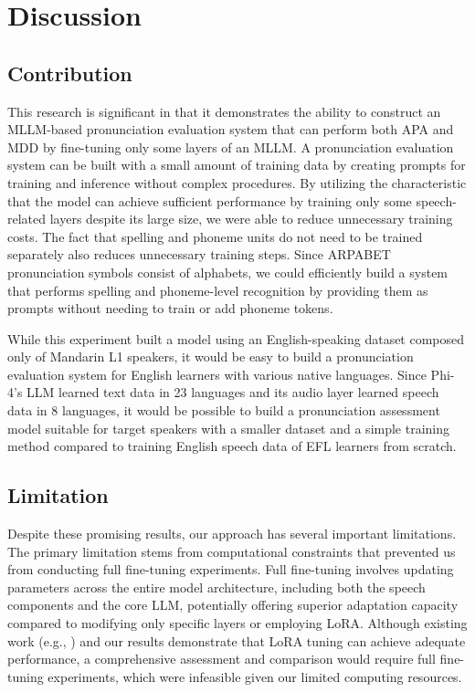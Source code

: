 \documentclass[sigconf,nonacm]{acmart}
\begin{document}
\section{Discussion}
\subsection{Contribution}
This research is significant in that it demonstrates the ability to construct an MLLM-based pronunciation evaluation system that can perform both APA and MDD by fine-tuning only some layers of an MLLM. A pronunciation evaluation system can be built with a small amount of training data by creating prompts for training and inference without complex procedures. By utilizing the characteristic that the model can achieve sufficient performance by training only some speech-related layers despite its large size, we were able to reduce unnecessary training costs. The fact that spelling and phoneme units do not need to be trained separately also reduces unnecessary training steps. Since ARPABET pronunciation symbols consist of alphabets, we could efficiently build a system that performs spelling and phoneme-level recognition by providing them as prompts without needing to train or add phoneme tokens.

While this experiment built a model using an English-speaking dataset composed only of Mandarin L1 speakers, it would be easy to build a pronunciation evaluation system for English learners with various native languages. Since Phi-4's LLM learned text data in 23 languages and its audio layer learned speech data in 8 languages, it would be possible to build a pronunciation assessment model suitable for target speakers with a smaller dataset and a simple training method compared to training English speech data of EFL learners from scratch.

\subsection{Limitation}
Despite these promising results, our approach has several important limitations. The primary limitation stems from computational constraints that prevented us from conducting full fine-tuning experiments. Full fine-tuning involves updating parameters across the entire model architecture, including both the speech components and the core LLM, potentially offering superior adaptation capacity compared to modifying only specific layers or employing LoRA. Although existing work (e.g., \cite{abouelenin2025phi}) and our results demonstrate that LoRA tuning can achieve adequate performance, a comprehensive assessment and comparison would require full fine-tuning experiments, which were infeasible given our limited computing resources.
\end{document}
